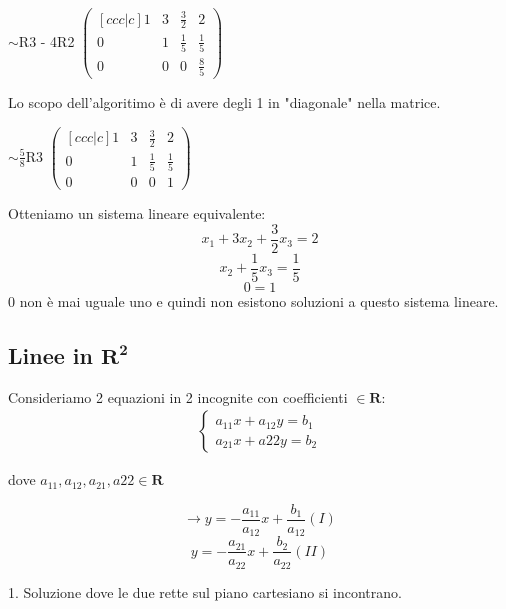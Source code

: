\documentclass[12pt]{article}
\begin{document}
\begin{center}
$\sim$R3 - 4R2
$\begin{pmatrix}[ccc|c]
  1 & 3 & \frac{3}{2} & 2\\
  0 & 1 & \frac{1}{5} & \frac{1}{5}\\
  0 & 0 & 0 & \frac{8}{5}
\end{pmatrix}$
\end{center}
Lo scopo dell'algoritimo è di avere degli 1 in "diagonale" nella matrice.
\begin{center}
$\sim \frac{5}{8}$R3
$\begin{pmatrix}[ccc|c]
  1 & 3 & \frac{3}{2} & 2\\
  0 & 1 & \frac{1}{5} & \frac{1}{5}\\
  0 & 0 & 0 & 1
\end{pmatrix}$
\end{center}
Otteniamo un sistema lineare equivalente:
\[x_1 + 3x_2 + \frac{3}{2}x_3 = 2\]
\[x_2 + \frac{1}{5}x_3 = \frac{1}{5}\]
\[0 = 1\]
0 non è mai uguale uno e quindi non esistono soluzioni a questo sistema lineare.

\subsection{Linee in $\mathbf{R^2}$}

Consideriamo 2 equazioni in 2 incognite con coefficienti $\in \mathbf{R}$:
\begin{align*}
  \begin{cases}
    a_{11}x + a_{12}y = b_1\\
    a_{21}x + a{22}y = b_2
  \end{cases}
\end{align*}

dove $a_{11}, a_{12}, a_{21}, a{22} \in \mathbf{R}$

\[\rightarrow y = -\frac{a_{11}}{a_{12}}x + \frac{b_1}{a_{12}} (I)\]
\[y = -\frac{a_{21}}{a_{22}}x + \frac{b_2}{a_{22}} (II)\]

1. Soluzione dove le due rette sul piano cartesiano si incontrano.
\end{document}
